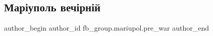  
 
 
 
 

\subsection{Маріуполь вечірній}
\label{sec:09_01_2023.fb.fb_group.mariupol.pre_war.3.mar_upol_vech_rn_i}

\ifcmt
 author_begin
   author_id fb_group.mariupol.pre_war
 author_end
\fi
